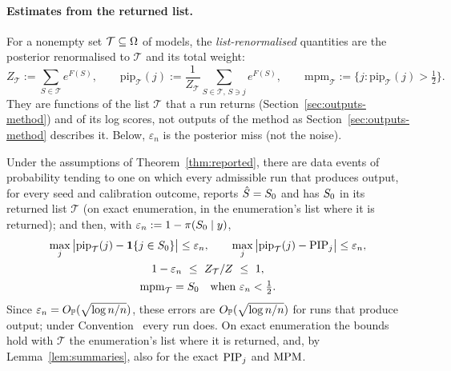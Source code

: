 
\paragraph{Estimates from the returned list.} For a nonempty set $\mathcal T\subseteq\Omega$ of models, the \emph{list-renormalised}
quantities are the posterior renormalised to $\mathcal T$ and its total weight:
\[
  Z_{\mathcal T}:=\sum_{S\in\mathcal T}e^{F(S)},\qquad
  \mathrm{pip}_{\mathcal T}(j):=\frac{1}{Z_{\mathcal T}}\sum_{S\in\mathcal T,\,S\ni j}e^{F(S)},\qquad
  \mathrm{mpm}_{\mathcal T}:=\{j:\mathrm{pip}_{\mathcal T}(j)>\tfrac12\}.
\]
They are functions of the list $\mathcal T$ that a run returns (Section~\ref{sec:outputs-method}) and of its log scores,
not outputs of the method as Section~\ref{sec:outputs-method} describes it. Below, $\varepsilon_n$ is the posterior miss
(not the noise).

\begin{corollary}\label{cor:list}
Under the assumptions of Theorem~\ref{thm:reported}, there are data events of probability tending to one on which every
admissible run that produces output, for every seed and calibration outcome, reports $\hat S=S_0$ and has $S_0$ in its
returned list $\mathcal T$ (on exact enumeration, in the enumeration's list where it is returned); and then, with $\varepsilon_n:=1-\pi(S_0\mid y)$,
\begin{gather}
  \max_j\big|\mathrm{pip}_{\mathcal T}(j)-\mathbf{1}\{j\in S_0\}\big|\le\varepsilon_n,\qquad
  \max_j\big|\mathrm{pip}_{\mathcal T}(j)-\mathrm{PIP}_j\big|\le\varepsilon_n,\label{eq:list-pip}\\
  1-\varepsilon_n\ \le\ Z_{\mathcal T}/Z\ \le\ 1,\label{eq:list-z}\\
  \mathrm{mpm}_{\mathcal T}=S_0\quad\text{when }\varepsilon_n<\tfrac12 .\label{eq:list-mpm}
\end{gather}
Since $\varepsilon_n=O_{\mathbb{P}}(\sqrt{\log n/n})$, these errors are $O_{\mathbb{P}}(\sqrt{\log n/n})$ for runs that produce output; under
Convention~ every run does. On exact enumeration the bounds hold with $\mathcal T$ the enumeration's list where it is
returned, and, by Lemma~\ref{lem:summaries}, also for the exact $\mathrm{PIP}_j$ and $\mathrm{MPM}$.
\end{corollary}


